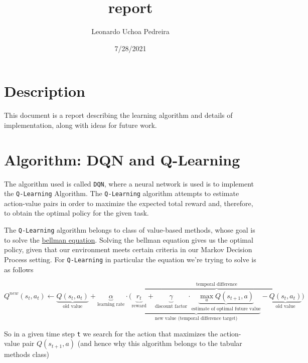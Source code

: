 \documentclass[
]{article}
\title{report}
\author{Leonardo Uchoa Pedreira}
\date{7/28/2021}
\begin{document}
\maketitle

{
\setcounter{tocdepth}{2}
\tableofcontents
}
\hypertarget{description}{%
\section{Description}\label{description}}

This document is a report describing the learning algorithm and details
of implementation, along with ideas for future work.

\hypertarget{algorithm-dqn-and-q-learning}{%
\section{Algorithm: DQN and
Q-Learning}\label{algorithm-dqn-and-q-learning}}

The algorithm used is called \texttt{DQN}, where a neural network is
used is to implement the \texttt{Q-Learning} Algorithm. The
\texttt{Q-Learning} algorithm attempts to estimate action-value pairs in
order to maximize the expected total reward and, therefore, to obtain
the optimal policy for the given task.

The \texttt{Q-Learning} algorithm belongs to class of value-based
methods, whose goal is to solve the
\href{https://en.wikipedia.org/wiki/Bellman_equation}{bellman equation}.
Solving the bellman equation gives us the optimal policy, given that our
environment meets certain criteria in our Markov Decision Process
setting. For \texttt{Q-Learning} in particular the equation we're trying
to solve is as follows

\[
\displaystyle Q^{new}(s_{t},a_{t})\leftarrow \underbrace {Q(s_{t},a_{t})} _{\text{old value}}+\underbrace {\alpha } _{\text{learning rate}}\cdot \overbrace {{\bigg (}\underbrace {\underbrace {r_{t}} _{\text{reward}}+\underbrace {\gamma } _{\text{discount factor}}\cdot \underbrace {\max _{a}Q(s_{t+1},a)} _{\text{estimate of optimal future value}}} _{\text{new value (temporal difference target)}}-\underbrace {Q(s_{t},a_{t})} _{\text{old value}}{\bigg )}} ^{\text{temporal difference}} 
\]

So in a given time step \texttt{t} we search for the action that
maximizes the action-value pair \(Q(s_{t+1},a)\) (and hence why this
algorithm belongs to the tabular methods class)
\end{document}
